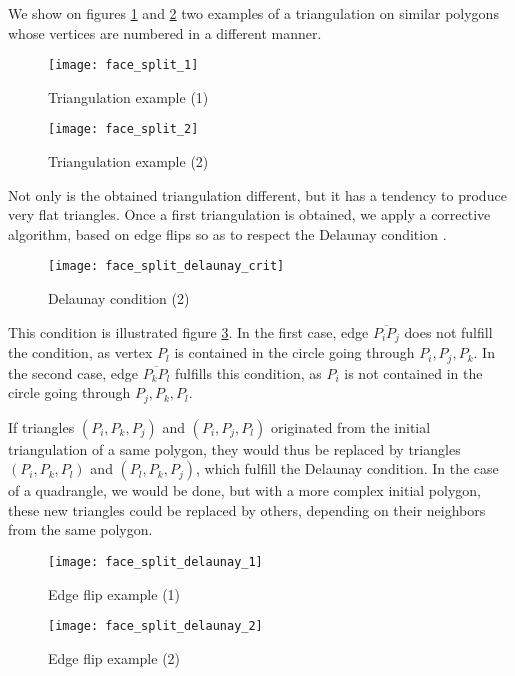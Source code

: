 We show on figures \ref{fig:algo.decoup_ex_1} and \ref{fig:algo.decoup_ex_2}
two examples of a triangulation on similar polygons whose vertices are
numbered in a different manner.

\begin{figure}[!h]
\centerline{
\texttt{[image: face\_split\_1]}}
\caption{Triangulation example (1)}
\label{fig:algo.decoup_ex_1}
\end{figure}

\begin{figure}[!h]
\centerline{
\texttt{[image: face\_split\_2]}}
\caption{Triangulation example (2)}
\label{fig:algo.decoup_ex_2}
\end{figure}

\vfill

Not only is the obtained triangulation different, but it has a tendency
to produce very flat triangles. Once a first triangulation is obtained,
we apply a corrective algorithm, based on edge flips so as to respect
the Delaunay condition \cite{Shewchuck:1999}.

\begin{figure}[!h]
\centerline{
\texttt{[image: face\_split\_delaunay\_crit]}}
\caption{Delaunay condition (2)}
\label{fig:algo.delaunay_cond}
\end{figure}

This condition is illustrated figure \ref{fig:algo.delaunay_cond}.
In the first case, edge $\overline{P_i P_j}$ does not fulfill the
condition, as vertex $P_l$ is contained in the circle going through
$P_i, P_j, P_k$. In the second case, edge $\overline{P_k P_l}$ fulfills
this condition, as $P_i$ is not contained in the circle going through
$P_j, P_k, P_l$.

If triangles $(P_i, P_k, P_j)$ and $(P_i, P_j, P_l)$ originated from
the initial triangulation of a same polygon, they would thus be replaced
by triangles $(P_i, P_k, P_l)$ and $(P_l, P_k, P_j)$, which
fulfill the Delaunay condition. In the case of a quadrangle, we
would be done, but with a more complex initial polygon,
these new triangles could be replaced by others, depending on their
neighbors from the same polygon.

\begin{figure}[!h]
\centerline{
\texttt{[image: face\_split\_delaunay\_1]}}
\caption{Edge flip example (1)}
\label{fig:algo.delaunay_ex_1}
\end{figure}

\begin{figure}[!h]
\centerline{
\texttt{[image: face\_split\_delaunay\_2]}}
\caption{Edge flip example (2)}
\label{fig:algo.delaunay_ex_2}
\end{figure}

